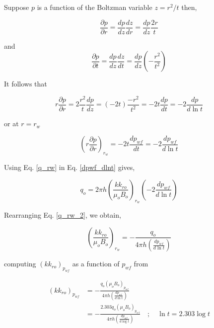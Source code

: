 \documentclass{llncs}
\numberwithin{equation}{section}
\numberwithin{figure}{section}
\numberwithin{table}{section}
\begin{document}
    Suppose $p$ is a function of the Boltzman variable $z=r^{2}/t$ then,

    \begin{equation}
        \frac{\partial p}{\partial r}=\frac{dp}{dz}\frac{dz}{dr}=\frac{dp}{dz}\frac{2r}{t}
        \label{chain_dpdr_z}
    \end{equation}

    and
    \begin{equation}
        \frac{\partial p}{\partial t}=\frac{dp}{dz}\frac{dz}{dt}=\frac{dp}{dz}\left( -\frac{{{r}^{2}}}{{{t}^{2}}} \right)
        \label{chain_dpdt_z}
    \end{equation}

    It follows that

    \begin{equation*}
    r\frac{\partial p}{\partial r}=2\frac{{{r}^{2}}}{t}\frac{dp}{dz}=\left( -2t \right)\frac{-{{r}^{2}}}{{{t}^{2}}}=-2t\frac{dp}{dt}=-2\frac{dp}{d\ln t}
    \end{equation*}

    or at $r=r_{w}$

    \begin{equation}
    {{\left( r\frac{\partial p}{\partial r} \right)}_{{{r}_{w}}}}=-2t\frac{d{{p}_{wf}}}{dt}=-2\frac{d{{p}_{wf}}}{d\ln t}
        \label{dpwf_dlnt}
    \end{equation}

    Using Eq. \ref{q_rw} in Eq. \ref{dpwf_dlnt} gives,

    \begin{equation}
    {{q}_{o}}=2\pi h{{\left( \frac{k{{k}_{ro}}}{{{\mu }_{o}}{{B}_{o}}} \right)}_{{{r}_{w}}}}\left( -2\frac{d{{p}_{wf}}}{d\ln t} \right)
        \label{q_rw_2}
    \end{equation}

    Rearranging Eq. \ref{q_rw_2}, we obtain,

    \begin{equation}
    {{\left( \frac{k{{k}_{ro}}}{{{\mu }_{o}}{{B}_{o}}} \right)}_{{{r}_{w}}}}=-\frac{{{q}_{o}}}{4\pi h\left( \frac{d{{p}_{wf}}}{d\ln t} \right)}
        \label{q_rw_3}
    \end{equation}

    computing ${{\left( k{{k}_{ro}} \right)}_{{{p}_{wf}}}}$ as a function of $p_{wf}$ from

    \begin{equation}
        \begin{split}
     {{\left( k{{k}_{ro}} \right)}_{{{p}_{wf}}}}&=-\frac{{{q}_{o}}{{\left( {{\mu }_{o}}{{B}_{o}} \right)}_{{{p}_{wf}}}}}{4\pi h\left( \frac{d{{p}_{wf}}}{d\ln t} \right)} \\
    & =-\frac{2.303{{q}_{o}}{{\left( {{\mu }_{o}}{{B}_{o}} \right)}_{{{p}_{wf}}}}}{4\pi h\left( \frac{d{{p}_{wf}}}{d\log t} \right)}\quad ;\quad \ln t=2.303\log t \\
    \end{split}
        \label{kkro_compute}
    \end{equation}
\end{document}
